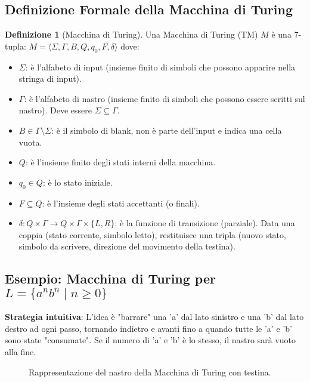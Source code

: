 \documentclass[a4paper]{article}
\theoremstyle{definition} %
\newtheorem{definition}{Definizione}
\newcommand{\blankS}{\ensuremath{\square}}
\begin{document}
\subsection{Definizione Formale della Macchina di Turing}
\begin{definition}[Macchina di Turing]
    Una Macchina di Turing (TM) $M$ è una 7-tupla:
    $M = \langle \Sigma, \Gamma, B, Q, q_0, F, \delta \rangle$
    dove:
    \begin{itemize}
        \item $\Sigma$: è l'alfabeto di input (insieme finito di simboli che possono apparire nella stringa di input).
        \item $\Gamma$: è l'alfabeto di nastro (insieme finito di simboli che possono essere scritti sul nastro). Deve essere $\Sigma \subseteq \Gamma$.
        \item $B \in \Gamma \setminus \Sigma$: è il simbolo di blank, non è parte dell'input e indica una cella vuota.
        \item $Q$: è l'insieme finito degli stati interni della macchina.
        \item $q_0 \in Q$: è lo stato iniziale.
        \item $F \subseteq Q$: è l'insieme degli stati accettanti (o finali).
        \item $\delta: Q \times \Gamma \to Q \times \Gamma \times \{L, R\}$: è la funzione di transizione (parziale). Data una coppia (stato corrente, simbolo letto), restituisce una tripla (nuovo stato, simbolo da scrivere, direzione del movimento della testina).
    \end{itemize}
\end{definition}

\subsection{Esempio: Macchina di Turing per $L = \{a^n b^n \mid n \ge 0\}$}
\textbf{Strategia intuitiva}:
L'idea è "barrare" una 'a' dal lato sinistro e una 'b' dal lato destro ad ogni passo, tornando indietro e avanti fino a quando tutte le 'a' e 'b' sono state "consumate". Se il numero di 'a' e 'b' è lo stesso, il nastro sarà vuoto alla fine.

\begin{figure}[h!]
    \centering
    \caption{Rappresentazione del nastro della Macchina di Turing con testina.}
\end{figure}
\end{document}
